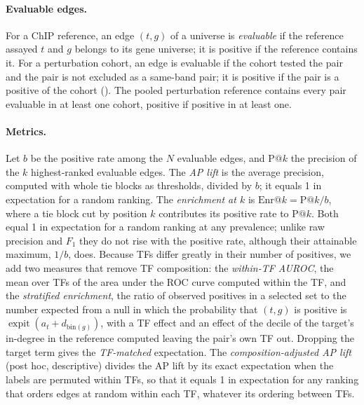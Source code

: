 \documentclass[11pt,a4paper]{article}
\begin{document}
\paragraph{Evaluable edges.}
For a ChIP reference, an edge $(t,g)$ of a universe is \emph{evaluable} if the reference assayed $t$ and $g$ belongs to its gene universe; it is positive if the reference contains it.
For a perturbation cohort, an edge is evaluable if the cohort tested the pair and the pair is not excluded as a same-band pair; it is positive if the pair is a positive of the cohort ().
The pooled perturbation reference contains every pair evaluable in at least one cohort, positive if positive in at least one.

\paragraph{Metrics.}
Let $b$ be the positive rate among the $N$ evaluable edges, and $\mathrm{P}@k$ the precision of the $k$ highest-ranked evaluable edges.
The \emph{AP lift} is the average precision, computed with whole tie blocks as thresholds, divided by $b$; it equals 1 in expectation for a random ranking.
The \emph{enrichment at $k$} is $\mathrm{Enr}@k=\mathrm{P}@k/b$, where a tie block cut by position $k$ contributes its positive rate to $\mathrm{P}@k$.
Both equal 1 in expectation for a random ranking at any prevalence; unlike raw precision and $F_1$ they do not rise with the positive rate, although their attainable maximum, $1/b$, does.
Because TFs differ greatly in their number of positives, we add two measures that remove TF composition: the \emph{within-TF AUROC}, the mean over TFs of the area under the ROC curve computed within the TF, and the \emph{stratified enrichment}, the ratio of observed positives in a selected set to the number expected from a null in which the probability that $(t,g)$ is positive is $\operatorname{expit}(a_t+d_{\mathrm{bin}(g)})$, with a TF effect and an effect of the decile of the target's in-degree in the reference computed leaving the pair's own TF out. Dropping the target term gives the \emph{TF-matched} expectation.
The \emph{composition-adjusted AP lift} (post hoc, descriptive) divides the AP lift by its exact expectation when the labels are permuted within TFs, so that it equals 1 in expectation for any ranking that orders edges at random within each TF, whatever its ordering between TFs.
\end{document}
